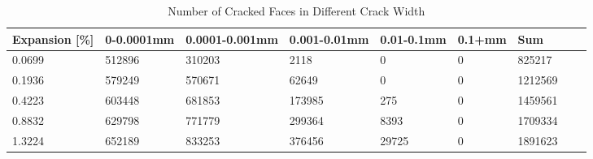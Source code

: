 
\begin{table}[ht!]
    \centering
    \begin{tabular}{| p{2.0cm} | p{1.6cm} | p{1.6cm} | p{1.6cm} | p{1.6cm} | p{1.6cm} | p{1.6cm} | p{1.6cm} | p{2.0cm} | }
    \hline
    
	Expansion [\%] & 0-0.0001mm & 0.0001-0.001mm & 0.001-0.01mm & 0.01-0.1mm & 0.1+mm & Sum \\ \hline

    0.0699 &	512896 &	310203 &	2118 &  	0 &	0 &	825217\\ \hline
    0.1936 &	579249 &	570671 &	62649 &	    0 &	0 &	1212569\\ \hline
    0.4223 &	603448 &	681853 &	173985 &	275 &	0 &	1459561\\ \hline
    0.8832 &	629798 &	771779 &	299364 &	8393 &	0 &	1709334\\ \hline
    1.3224 &	652189 &	833253 &	376456 &	29725 &	0 &	1891623\\ \hline

    \end{tabular}
    \caption{Number of Cracked Faces in Different Crack Width}
    \label{}
\end{table}

